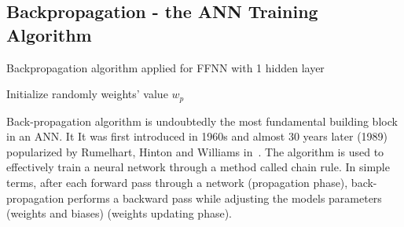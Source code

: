 \documentclass[a4paper,13pt,2p]{report}
\begin{document}
\subsection{Backpropagation - the ANN Training Algorithm}
\label{ann_backprop_alg}

\begin{algorithm}[!t]
	\caption{Backpropagation algorithm applied for FFNN with 1 hidden layer}
	\label{algorithm_backprop}
	\SetAlgoLined
	Initialize randomly weights' value $w_p$\\ 
		
\end{algorithm}

Back-propagation algorithm is undoubtedly the most fundamental building block in an ANN. It It was first introduced in 1960s and almost 30 years later (1989) popularized by Rumelhart, Hinton and Williams in~\cite{rumelhart1988learning}. The algorithm is used to effectively train a neural network through a method called chain rule. In simple terms, after each forward pass through a network (propagation phase), back-propagation performs a backward pass while adjusting the model\textquotesingle s parameters (weights and biases) (weights updating phase).
\end{document}
